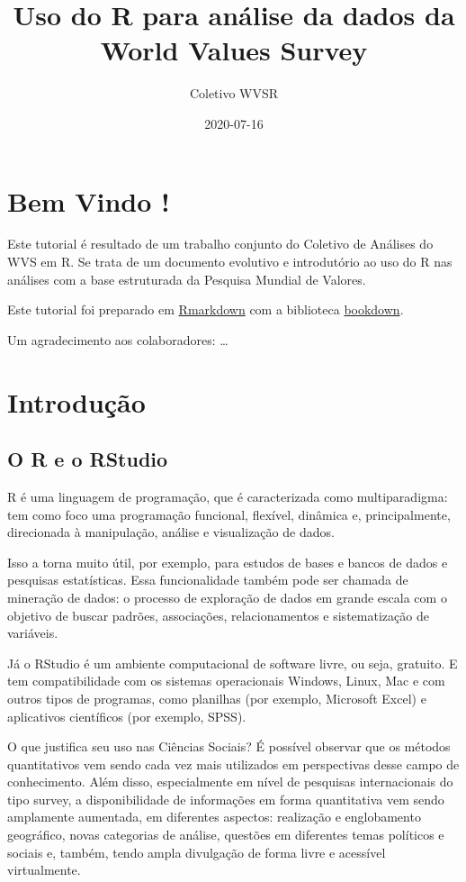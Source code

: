 \documentclass[
  brazil,
]{book}
\title{Uso do R para análise da dados da World Values Survey}
\author{Coletivo WVSR}
\date{2020-07-16}
\begin{document}
\maketitle

{
\setcounter{tocdepth}{1}
\tableofcontents
}
\hypertarget{bem-vindo}{%
\chapter*{Bem Vindo !}\label{bem-vindo}}

Este tutorial é resultado de um trabalho conjunto do Coletivo de Análises do WVS em R. Se trata de um documento evolutivo e introdutório ao uso do R nas análises com a base estruturada da Pesquisa Mundial de Valores.

Este tutorial foi preparado em \href{https://rmarkdown.rstudio.com/}{Rmarkdown} com a biblioteca \href{https://bookdown.org/}{bookdown}.

Um agradecimento aos colaboradores: \ldots{}

\hypertarget{intro}{%
\chapter{Introdução}\label{intro}}

\hypertarget{o-r-e-o-rstudio}{%
\section{O R e o RStudio}\label{o-r-e-o-rstudio}}

R é uma linguagem de programação, que é caracterizada como multiparadigma: tem como foco uma programação funcional, flexível, dinâmica e, principalmente, direcionada à manipulação, análise e visualização de dados.

Isso a torna muito útil, por exemplo, para estudos de bases e bancos de dados e pesquisas estatísticas. Essa funcionalidade também pode ser chamada de mineração de dados: o processo de exploração de dados em grande escala com o objetivo de buscar padrões, associações, relacionamentos e sistematização de variáveis.

Já o RStudio é um ambiente computacional de software livre, ou seja, gratuito. E tem compatibilidade com os sistemas operacionais Windows, Linux, Mac e com outros tipos de programas, como planilhas (por exemplo, Microsoft Excel) e aplicativos científicos (por exemplo, SPSS).

O que justifica seu uso nas Ciências Sociais? É possível observar que os métodos quantitativos vem sendo cada vez mais utilizados em perspectivas desse campo de conhecimento. Além disso, especialmente em nível de pesquisas internacionais do tipo survey, a disponibilidade de informações em forma quantitativa vem sendo amplamente aumentada, em diferentes aspectos: realização e englobamento geográfico, novas categorias de análise, questões em diferentes temas políticos e sociais e, também, tendo ampla divulgação de forma livre e acessível virtualmente.
\end{document}
